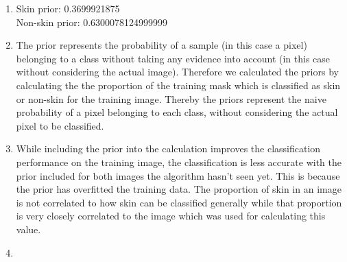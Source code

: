 \documentclass[11pt]{article}
\begin{document}
\begin{enumerate}[1.]
	\item Skin prior: 0.3699921875\\Non-skin prior: 0.6300078124999999
	\item The prior represents the probability of a sample (in this case a pixel) belonging to a class without taking any evidence into account (in this case without considering the actual image). Therefore we calculated the priors by calculating the the proportion of the training mask which is classified as skin or non-skin for the training image. Thereby the priors represent the naive probability of a pixel belonging to each class, without considering the actual pixel to be classified. 
	\item While including the prior into the calculation improves the classification performance on the training image, the classification is less accurate with the prior included for both images the algorithm hasn't seen yet. This is because the prior has overfitted the training data. The proportion of skin in an image is not correlated to how skin can be classified generally while that proportion is very closely correlated to the image which was used for calculating this value.
	\item 
\end{enumerate}
\end{document}
